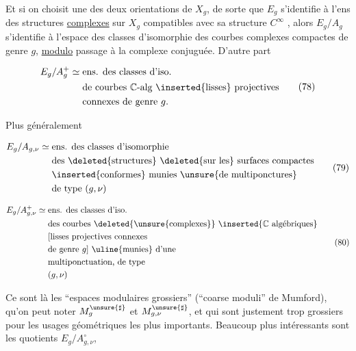 Et si on choisit une des deux orientations de \(X_g\), de sorte que \(E_g\) s'identifie à l'ens des structures \uline{complexes} sur \(X_g\) compatibles avec sa structure \(C^\infty\) , alors \(E_g/A_g\) s'identifie à l'espace des classes d'isomorphie des courbes complexes  compactes de genre \(g\), \uline{modulo} passage à la complexe conjuguée. D'autre part


\[
 \begin{aligned}
 E_g/A_g^+\simeq{}&\text{ens. des classes d'iso.}\\
 &\text{de courbes }\mathbb C\text{-alg \inserted{lisses} projectives}\\
 &\text{connexes de genre }g.
 \end{aligned}
 \tag{78}
\]

Plus généralement

\[
 \begin{aligned}
 E_g/A_{g,\nu}\simeq{}&\text{ens. des classes d'isomorphie}\\
 &\text{des \deleted{structures} \deleted{sur les} surfaces compactes}\\
 &\text{\inserted{conformes} munies \unsure{de multiponctures}}\\
 &\text{de type }(g,\nu)
 \end{aligned}
 \tag{79}
\]

\[
 \begin{aligned}
 E_g/A_{g,\nu}^{+}\simeq{}&\text{ens. des classes d'iso.}\\
 &\text{des courbes \deleted{\unsure{complexes}} \inserted{\(\mathbb C\) algébriques}}\\
 &\text{[lisses projectives connexes}\\
 &\text{de genre }g\text{] \uline{munies} d'une}\\
 &\text{multiponctuation, de type}\\
 &(g,\nu)
 \end{aligned}
 \tag{80}
\]

Ce sont là les ``espaces modulaires grossiers'' (``coarse moduli'' de Mumford), qu'on peut noter \(M_g^{\unsure{\sharp}}\) et \(M_{g,\nu}^{\unsure{\sharp}}\), et qui sont justement trop grossiers pour les usages géométriques les plus importants.  Beaucoup plus intéressants sont les quotients \(E_g/A_{g,\nu}^{\circ}\), 


